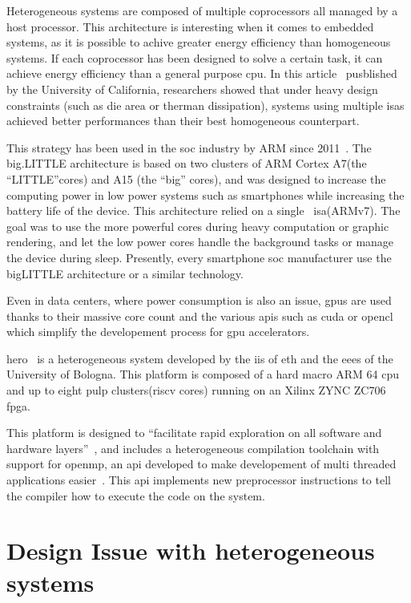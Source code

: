 	Heterogeneous systems are composed of multiple coprocessors all managed by a host processor. This architecture is interesting when it comes to embedded systems, as it is possible to achive greater energy efficiency than homogeneous systems. If each coprocessor has been designed to solve a certain task, it can achieve energy efficiency than a general purpose \gls{cpu}. 
	In this article~\cite{Art:Harnessing} pusblished by the University of California,  researchers showed that under heavy design constraints (such as die area or therman dissipation), systems using multiple \glspl{isa} achieved better performances than their best homogeneous counterpart.

This strategy has been used in the \gls{soc} industry by ARM since 2011~\cite{Art:bigLITTLE}. The  big.LITTLE architecture is based on two clusters of ARM Cortex A7(the ``LITTLE''cores) and A15 (the ``big'' cores), and was designed to increase the computing power in low power systems such as smartphones while increasing the battery life of the device. This architecture relied on a single~ \gls{isa}(ARMv7). The goal was to use the more powerful cores during heavy computation or graphic rendering, and let the low power cores handle the background tasks or manage the device during sleep.
	Presently, every smartphone \gls{soc} manufacturer use the bigLITTLE architecture or a similar technology.


Even in data centers, where power consumption is also an issue, \glspl{gpu} are used thanks to their massive core count and the various \glspl{api} such as \gls{cuda} or \gls{opencl} which simplify the developement process for \gls{gpu} accelerators.

    \gls{hero}~\cite{Art:Hero} is a heterogeneous system developed by the \gls{iis} of \acrshort{eth} and the \gls{eees} of the University of Bologna.
	This platform is composed of a hard macro ARM 64 \gls{cpu} and up to eight \gls{pulp} clusters(\gls{riscv} cores) running on an Xilinx ZYNC ZC706 \gls{fpga}.

    This platform is designed to ``facilitate rapid exploration on all software and hardware layers''~\cite{Art:Hero}, and includes a heterogeneous compilation toolchain with support for \gls{openmp}, an \gls{api} developed to make developement of multi threaded applications easier~\cite{Web:Wikipedia_OpenMP}. This \gls{api} implements new preprocessor instructions to tell the compiler how to execute the code on the system.



\section {Design Issue with heterogeneous systems}

